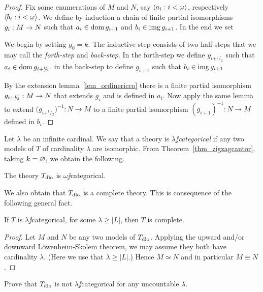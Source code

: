 \documentclass[creche.tex]{subfiles}
\begin{document}
\begin{proof}
Fix some enumerations of $M$ and $N$, say $\langle a_i:i<\omega\rangle$, respectively $\langle b_i:i<\omega\rangle$.  We define by induction a chain of finite partial isomorphisms $g_i:M\rightarrow N$ such that $a_i\in\mathop{\rm dom} g_{i+1}$ and $b_i\in\mathop{\rm img} g_{i+1}$. In the end we set


We begin by setting $g_0=k$. The inductive step consists of two half-steps that we may call the \textit{forth-step} and \textit{back-step}. In the forth-step we define $g_{i+^1\!\!/\!_2}$ such that $a_i\in\mathop{\rm dom} g_{i+^1\!\!/\!_2}$. in the back-step to define $g_{i+1}$ such that $b_i\in\mathop{\rm img} g_{i+1}$

By the extension lemma~\ref{lem_ordinericco} there is a finite partial isomorphism $g_{i+^1\!\!/\!_2}:M\rightarrow N$ that extends $g_i$ and is defined in $a_i$. Now apply the same lemma to extend $\big(g_{i+^1\!\!/\!_2}\big)^{-1}:N\to M$ to a finite partial isomorphism $(g_{i+1})^{-1}:N\to M$ defined in $b_i$.
\end{proof}

Let $\lambda$ be an infinite cardinal. We say that a theory is \emph{$\lambda\jj$categorical\/} if any two models of $T$ of cardinality $\lambda$ are isomorphic. From Theorem~\ref{thm_zigzagcantor}, taking $k=\varnothing$, we obtain the following.

\begin{corollary}
The theory $T_{\rm dlo}$ is $\omega\jj$categorical.\QED
\end{corollary}

We also obtain that $T_{\rm dlo}$ is a complete theory. This is consequence of the following general fact.

\begin{proposition}\label{thm_categorical->complete}
If $T$ is $\lambda\jj$categorical, for some $\lambda\ge|L|$, then $T$ is complete.
\end{proposition}

\begin{proof}
Let $M$ and $N$ be any two models of $T_{\rm dlo}$. Applying the upward and/or downward L\"owenheim-Skolem theorem, we may assume they both have cardinality $\lambda$. (Here we use that $\lambda\ge|L|$.) Hence $M\simeq N$ and in particular $M\equiv N$.
\end{proof}

\begin{exercise}
Prove that $T_{\rm dlo}$ is not $\lambda\jj$categorical for any uncountable $\lambda$.\QED
\end{exercise}
\end{document}
